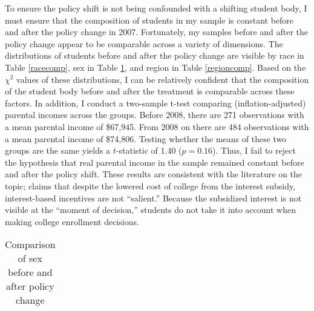 \documentclass[12pt]{article}
\begin{document}
	To ensure the policy shift is not being confounded with a shifting student body, I must ensure that the composition of students in my sample is constant before and after the policy change in 2007. Fortunately, my samples before and after the policy change appear to be comparable across a variety of dimensions. The distributions of students before and after the policy change are visible by race in Table \ref{racecomp}, sex in Table \ref{sexcomp}, and region in Table \ref{regioncomp}. Based on the $\chi^2$ values of these distributions, I can be relatively confident that the composition of the student body before and after the treatment is comparable across these factors. In addition, I conduct a two-sample t-test comparing (inflation-adjusted) parental incomes across the groups. Before 2008, there are 271 observations with a mean parental income of \$67,945. From 2008 on there are 484 observations with a mean parental income of \$74,806. Testing whether the means of these two groups are the same yields a $t$-statistic of 1.40 ($p = 0.16$). Thus, I fail to reject the hypothesis that real parental income in the sample remained constant before and after the policy shift. These results are consistent with the literature on the topic; \textcite{dynarski2015} claims that despite the lowered cost of college from the interest subsidy, interest-based incentives are not ``salient.'' Because the subsidized interest is not visible at the ``moment of decision,'' students do not take it into account when making college enrollment decisions. 
	
{
	\begin{table}
		\centering
		\caption{Comparison of race before and after policy change}
		\label{racecomp}
	\end{table}

	\begin{table}
		\small
		\centering
		\caption{Comparison of sex before and after policy change}
		\begin{tabular}{lrrrrrr}
			
		\end{tabular}
		\label{sexcomp}
	\end{table}

	\begin{table}
		\centering
		\caption{Comparison of region before and after policy change}
		\label{regioncomp}
	\end{table}
}
	
\end{document}
